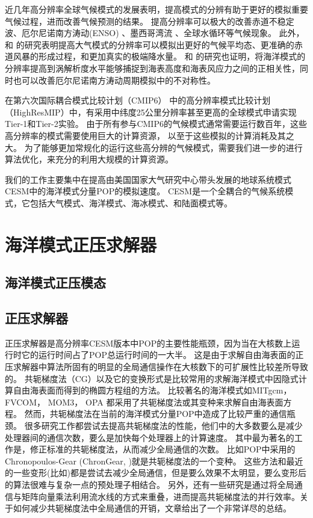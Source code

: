 近几年高分辨率全球气候模式的发展表明，提高模式的分辨有助于更好的模拟重要气候过程，进而改善气候预测的结果。
提高分辨率可以极大的改善赤道不稳定波\citep{roberts2009impact}、厄尔尼诺南方涛动(ENSO) \citep{shaffrey2009uk}、墨西哥湾流\citep{chassignet2008gulf, kuwano2010precipitation} 、全球水循环\citep{demory2014role}等气候现象。
此外，\cite{gent2010improvements} 和 \cite{wehner2014effect}的研究表明提高大气模式的分辨率可以模拟出更好的气候平均态、更准确的赤道风暴的形成过程，和更加真实的极端降水量。
 \cite{bryan2010frontal} 和 \cite{graham2014importance}的研究也证明，将海洋模式的分辨率提高到涡解析度水平能够捕捉到海表高度和海表风应力之间的正相关性，同时也可以改善厄尔尼诺南方涛动周期模拟中的不对称性。


在第六次国际耦合模式比较计划（CMIP6） 中的高分辨率模式比较计划（HighResMIP）中，有采用中纬度25公里分辨率甚至更高的全球模式申请实现Tier-1和Tier-2实验。 
由于所有参与CMIP6的气候模式通常需要运行数百年，这些高分辨率的模式需要使用巨大的计算资源， 以至于这些模拟的计算消耗及其之大。
为了能够更加常规化的运行这些高分辨的气候模式，需要我们进一步的进行算法优化，来充分的利用大规模的计算资源。

 
我们的工作主要集中在提高由美国国家大气研究中心带头发展的地球系统模式CESM中的海洋模式分量POP的模拟速度。 CESM是一个全耦合的气候系统模式，它包括大气模式、海洋模式、海冰模式、和陆面模式等。


\section{海洋模式正压求解器}
\subsection{海洋模式正压模态}

\subsection{正压求解器}
正压求解器是高分辨率CESM版本中POP的主要性能瓶颈，因为当在大核数上运行时它的运行时间占了POP总运行时间的一大半。 
这是由于求解自由海表面的正压求解器中算法所固有的明显的全局通信操作在大核数下的可扩展性比较差所导致的。
共轭梯度法（CG）以及它的变换形式是比较常用的求解海洋模式中因隐式计算自由海表面而得到的椭圆方程组的方法。
比较著名的海洋模式如MITgcm\citep{adcroft2014mitgcm}， FVCOM\citep{lai2010nonhydrostatic}， MOM3\citep{pacanowsky1999mom3}， OPA \citep{madec1997ocean}
都采用了共轭梯度法或其变种来求解自由海表面方程。
然而，共轭梯度法在当前的海洋模式分量POP中造成了比较严重的通信瓶颈\citep{Worley:2011:PCE:2063384.2063457}。 
很多研究工作都尝试去提高共轭梯度法的性能，他们中的大多数要么是减少处理器间的通信次数，要么是加快每个处理器上的计算速度。
其中最为著名的工作是，修正标准的共轭梯度法，从而减少全局通信的次数。 比如POP中采用的Chronopoulos-Gear (ChronGear, \cite{dAzevedo1999lapack})就是共轭梯度法的一个变种。
这些方法和最近的一些变形(比如\cite{hoemmen2010})都是尝试去减少全局通信，但是要么效果不太明显，要么变形后的算法很难与复杂一点的预处理子相结合\citep{ghysels2014}。
另外，还有一些研究是通过将全局通信与矩阵向量乘法利用流水线的方式来重叠，进而提高共轭梯度法的并行效率。关于如何减少共轭梯度法中全局通信的开销，文章\cite{ghysels2014}给出了一个非常详尽的总结。

